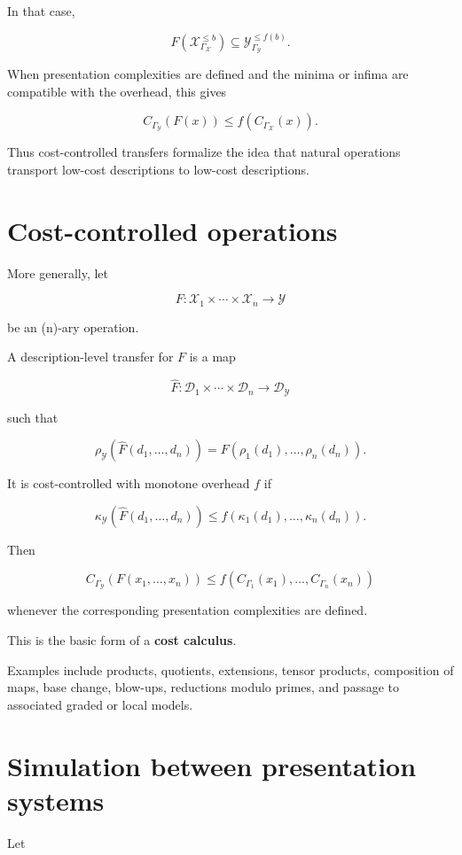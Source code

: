 \documentclass[11pt]{article}
\begin{document}
In that case,

\[
F(\mathcal X_{\Gamma_\mathcal X}^{\leq b})
\subseteq
\mathcal Y_{\Gamma_\mathcal Y}^{\leq f(b)}.
\]

When presentation complexities are defined and the minima or infima are compatible with the overhead, this gives

\[
C_{\Gamma_\mathcal Y}(F(x))
\leq
f(C_{\Gamma_\mathcal X}(x)).
\]

Thus cost-controlled transfers formalize the idea that natural operations transport low-cost descriptions to low-cost descriptions.


\section{Cost-controlled operations}

More generally, let

\[
F:\mathcal X_1\times\cdots\times \mathcal X_n\to \mathcal Y
\]

be an (n)-ary operation.

A description-level transfer for \(F\) is a map

\[
\widehat F:
\mathcal D_1\times\cdots\times \mathcal D_n
\to
\mathcal D_\mathcal Y
\]

such that

\[
\rho_\mathcal Y(\widehat F(d_1,\dots,d_n))=F(\rho_1(d_1),\dots,\rho_n(d_n)).
\]

It is cost-controlled with monotone overhead \(f\) if

\[
\kappa_\mathcal Y(\widehat F(d_1,\dots,d_n))
\leq
f(\kappa_1(d_1),\dots,\kappa_n(d_n)).
\]

Then

\[
C_{\Gamma_\mathcal Y}(F(x_1,\dots,x_n))
\leq
f(C_{\Gamma_1}(x_1),\dots,C_{\Gamma_n}(x_n))
\]

whenever the corresponding presentation complexities are defined.

This is the basic form of a \textbf{cost calculus}.

Examples include products, quotients, extensions, tensor products, composition of maps, base change, blow-ups, reductions modulo primes, and passage to associated graded or local models.


\section{Simulation between presentation systems}

Let
\end{document}
